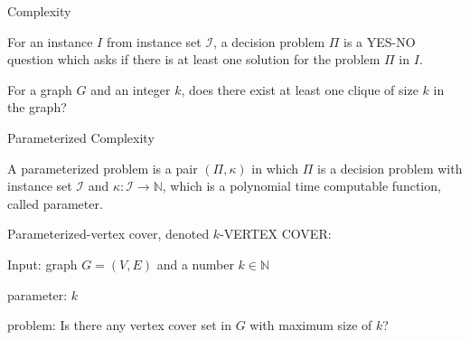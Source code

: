 \documentclass{beamer}
\begin{document}
\begin{frame}{Complexity}

\begin{definition}
For an instance $I$ from instance set $\mathcal{I}$, a \color{red} decision problem \color{black} $\Pi$ is a YES-NO question which asks if
there is at least one solution for the problem $\Pi$ in $I$.
\end{definition}
\begin{example}
For a graph $G$ and an integer $k$, does there exist at least one clique of size $k$ in the graph? 

\end{example}
\end{frame}
\begin{frame}{Parameterized Complexity}
\begin{definition}
A \color{red} parameterized problem \color{black} is a pair $(\Pi, \kappa)$ in which $\Pi$ is a
decision problem with instance set $\mathcal{I}$ and $\kappa : \mathcal{I} \to \mathbb{N}$, which is a polynomial
time computable function, called parameter.
\end{definition}

\begin{example}
Parameterized-vertex cover, denoted $k$-VERTEX COVER:

Input: graph $G = (V, E)$ and a number $k \in \mathbb{N}$

parameter: $k$

problem: Is there any vertex cover set in $G$ with maximum size of $k$?
\end{example}

\end{frame}
\end{document}
